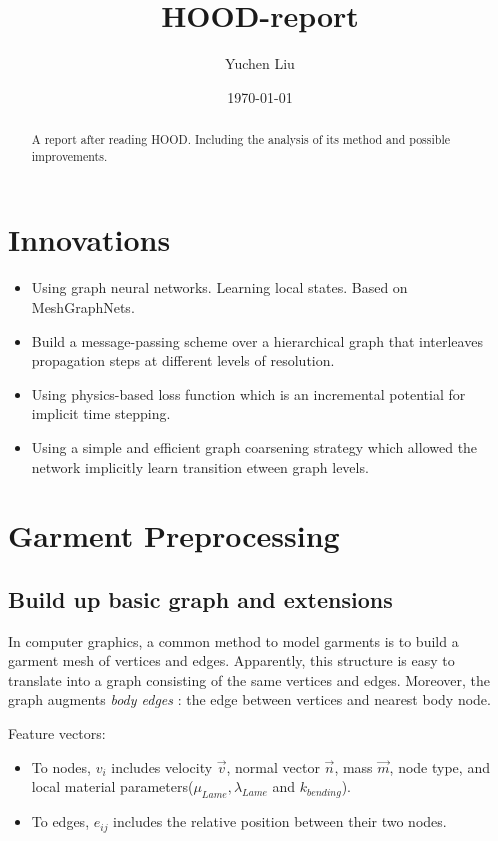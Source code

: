 \documentclass{article}
\title{HOOD-report}
\author{Yuchen Liu}
\date{\today}
\begin{document}
\maketitle
\tableofcontents
\begin{abstract}
    A report after reading HOOD\cite{grigorev2023hood}. Including the analysis of its method and possible improvements.
\end{abstract}
\section{Innovations}
\begin{itemize}
    \item Using graph neural networks. Learning local states. Based on MeshGraphNets\cite{pfaff2021learning}.
    \item Build a message-passing scheme over a hierarchical graph that interleaves propagation steps at different levels of resolution.
    \item Using physics-based loss function which is an incremental potential for implicit time stepping.
    \item Using a simple and efficient graph coarsening strategy which allowed the network implicitly learn transition etween graph levels.
\end{itemize}

\section{Garment Preprocessing}
\subsection{Build up basic graph and extensions}
\par In computer graphics, a common method to model garments is to build a garment mesh of vertices and edges. Apparently, this structure is easy to translate into a graph consisting of the same vertices and edges. Moreover, the graph augments \textit{body edges} : the edge between vertices and nearest body node.
\par Feature vectors:
\begin{itemize}
    \item To nodes, $v_i$ includes velocity $\vec{v}$, normal vector $\vec{n}$, mass $\vec{m}$, node type, and local material parameters($\mu_{Lame}, \lambda_{Lame}$ and $k_{bending} $).
    \item To edges, $e_{ij}$ includes the relative position between their two nodes.
\end{itemize}
\par 
\end{document}

